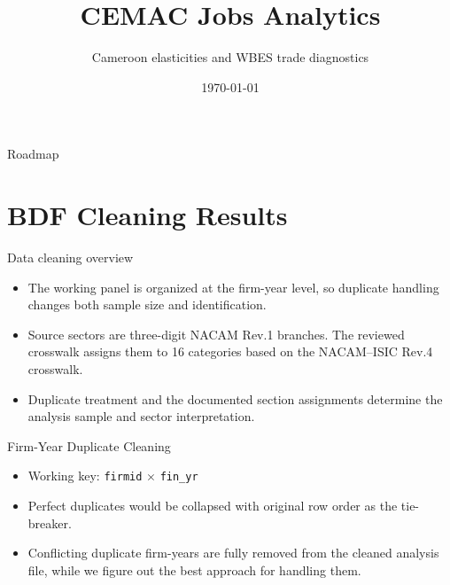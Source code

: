 \documentclass[aspectratio=169]{beamer}
\title{CEMAC Jobs Analytics}
\subtitle{Cameroon elasticities and WBES trade diagnostics}
\author{}
\date{\today}
\begin{document}
\begin{frame}[plain]
    \titlepage
\end{frame}

\begin{frame}{Roadmap}
    \tableofcontents
\end{frame}

\section{BDF Cleaning Results}

\begin{frame}{Data cleaning overview}
    \begin{itemize}
        \item The working panel is organized at the firm-year level, so duplicate handling changes both sample size and identification.
        \item Source sectors are three-digit NACAM Rev.1 branches. The reviewed crosswalk assigns them to 16 categories based on the NACAM--ISIC Rev.4 crosswalk.
        \item Duplicate treatment and the documented section assignments determine the analysis sample and sector interpretation.
    \end{itemize}
\end{frame}

\begin{frame}{Firm-Year Duplicate Cleaning}
    \footnotesize
    \begin{itemize}
        \item Working key: \texttt{firmid} $\times$ \texttt{fin\_yr}
        \item Perfect duplicates would be collapsed with original row order as the tie-breaker.
        \item Conflicting duplicate firm-years are fully removed from the cleaned analysis file, while we figure out the best approach for handling them.
    \end{itemize}

    \vspace{0.2cm}
    \centering
\end{frame}
\end{document}
